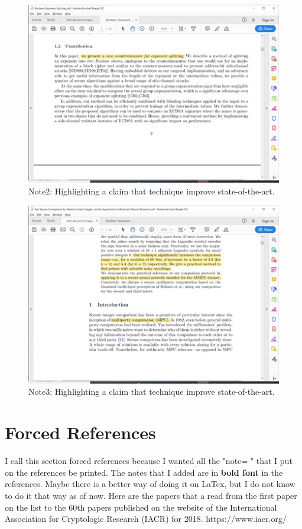 \documentclass{IEEEtran}
\begin{document}
\begin{figure}[ht!]
\centering
\includegraphics[scale=0.75]{Note2.jpg}
\caption{Note2: Highlighting a claim that technique improve state-of-the-art. \cite{tunstall2018boolean}}
\label{fig:Note2}
\end{figure}

\begin{figure}[ht!]
\centering
\includegraphics[scale=0.75]{Note3.jpg}
\caption{Note3: Highlighting a claim that technique improve state-of-the-art. \citep{abspoel2019fast}}
\label{fig:Note3}
\end{figure}

\section{Forced References}
I call this section forced references because I wanted all the "note= " that I put on the references be printed. The notes that I added are in \textbf{bold font} in the references. Maybe there is a better way of doing it on LaTex, but I do not know to do it that way as of now. Here are the papers that a read from the first paper on the list to the 60th papers published on the website of the International Association for Cryptologic Research (IACR) for 2018. https://www.iacr.org/  
\end{document}
